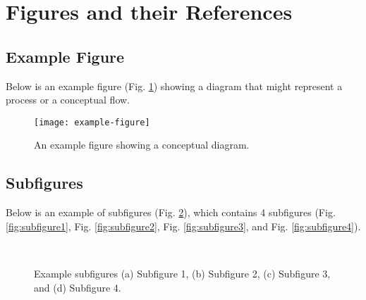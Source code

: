 \section{Figures and their References}

\subsection{Example Figure}

Below is an example figure (Fig. \ref{fig:examplefig}) showing a diagram that might represent a process or a conceptual flow.

\begin{figure}[htbp]
    \centering
    \texttt{[image: example-figure]}
    \caption{
        An example figure showing a conceptual diagram.
    }
    \label{fig:examplefig}
\end{figure}

\subsection{Subfigures}

Below is an example of subfigures (Fig. \ref{fig:examplesubfigures}), which contains 4 subfigures (Fig. \ref{fig:subfigure1}, Fig. \ref{fig:subfigure2}, Fig. \ref{fig:subfigure3}, and Fig. \ref{fig:subfigure4}).

\begin{figure}[htbp]
    \centering
    \\
    \caption{
        Example subfigures (a) Subfigure 1, (b) Subfigure 2, (c) Subfigure 3, and (d) Subfigure 4.
    }
    \label{fig:examplesubfigures}
\end{figure}